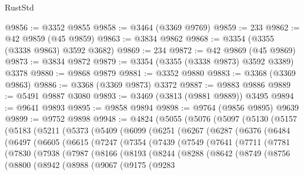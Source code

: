\begin{lexlean}{RustStd}
\begin{coremodule}
@9856 := @3352 @9855
@9858 := @3464 (@3369 @9769)
@9859 := 233
@9862 := @42 @9859 (@45 @9859)
@9863 := @3834 @9862
@9868 := @3354 (@3355 (@3338 @9863) @3592 @3682)
@9869 := 234
@9872 := @42 @9869 (@45 @9869)
@9873 := @3834 @9872
@9879 := @3354 (@3355 (@3338 @9873) @3592 @3389) @3378
@9880 := @9868 @9879
@9881 := @3352 @9880
@9883 := @3368 (@3369 @9863)
@9886 := @3368 (@3369 @9873) @3372
@9887 := @9883 @9886
@9889 := @5491 @9887 @3080
@9893 := @3469 (@3813 (@9881 @9889)) @3495
@9894 := @9641 @9893
@9895 := @9858 @9894
@9898 := @9764 (@9856 @9895) @9639
@9899 := @9752 @9898
@9948 := @4824
    (@5055
      (@5076
        (@5097
          (@5130
            (@5157
              (@5183
                (@5211
                  (@5373
                    (@5409
                      (@6099
                        (@6251
                          (@6267
                            (@6287
                              (@6376
                                (@6484
                                  (@6497
                                    (@6605
                                      (@6615
                                        (@7247
                                          (@7354
                                            (@7439
                                              (@7549
                                                (@7641
                                                  (@7711
                                                    (@7781
                                                      (@7830
                                                        (@7938
                                                          (@7987
                                                            (@8166
                                                              (@8193
                                                                (@8244
                                                                  (@8288
                                                                    (@8642
                                                                      (@8749
                                                                        (@8756
                                                                          (@8800
                                                                            (@8942
                                                                              (@8988
                                                                                (@9067
                                                                                  (@9175
                                                                                    (@9283

\end{coremodule}
\end{lexlean}
